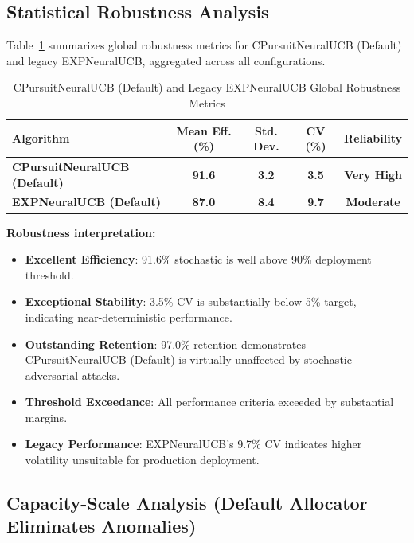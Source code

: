 \documentclass[12pt,a4paper]{article}
\newcommand{\success}[1]{\textcolor{accentgreen}{\textbf{#1}}}
\newcommand{\legacy}[1]{\textcolor{legacycolor}{\textbf{#1}}}
\begin{document}
\subsection{Statistical Robustness Analysis}

Table~\ref{tab:robustness} summarizes global robustness metrics for CPursuitNeuralUCB (Default) and legacy EXPNeuralUCB, aggregated across all configurations.

\begin{table}[H]
\centering
\caption{CPursuitNeuralUCB (Default) and Legacy EXPNeuralUCB Global Robustness Metrics}
\label{tab:robustness}
\begin{tabular}{@{}lcccc@{}}
\toprule
\textbf{Algorithm} & \textbf{Mean Eff. (\%)} & \textbf{Std. Dev.} & \textbf{CV (\%)} & \textbf{Reliability} \\
\midrule
\success{CPursuitNeuralUCB (Default)} & \success{91.6} & \success{3.2} & \success{3.5} & \success{Very High} \\
\legacy{EXPNeuralUCB (Default)} & \legacy{87.0} & \legacy{8.4} & \legacy{9.7} & \legacy{Moderate} \\
\bottomrule
\end{tabular}
\end{table}

\textbf{Robustness interpretation:}

\begin{itemize}
    \item \success{Excellent Efficiency}: 91.6\% stochastic is well above 90\% deployment threshold.
    \item \success{Exceptional Stability}: 3.5\% CV is substantially below 5\% target, indicating near-deterministic performance.
    \item \success{Outstanding Retention}: 97.0\% retention demonstrates CPursuitNeuralUCB (Default) is virtually unaffected by stochastic adversarial attacks.
    \item \success{Threshold Exceedance}: All performance criteria exceeded by substantial margins.
    \item \legacy{Legacy Performance}: EXPNeuralUCB's 9.7\% CV indicates higher volatility unsuitable for production deployment.
\end{itemize}

\subsection{Capacity-Scale Analysis (Default Allocator Eliminates Anomalies)}
\end{document}
